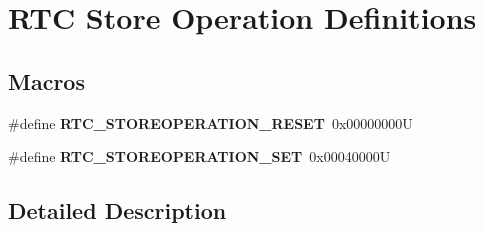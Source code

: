 \hypertarget{group___r_t_c___store_operation___definitions}{}\section{R\+TC Store Operation Definitions}
\label{group___r_t_c___store_operation___definitions}
\subsection*{Macros}
\begin{DoxyCompactItemize}
\item 
\mbox{\label{group___r_t_c___store_operation___definitions_ga0c0fb2efa26fd29872759f6162fafefa}} 
\#define {\bfseries R\+T\+C\+\_\+\+S\+T\+O\+R\+E\+O\+P\+E\+R\+A\+T\+I\+O\+N\+\_\+\+R\+E\+S\+ET}~0x00000000U
\item 
\mbox{\label{group___r_t_c___store_operation___definitions_ga984ee81edc6b876d035683d65a5c60d8}} 
\#define {\bfseries R\+T\+C\+\_\+\+S\+T\+O\+R\+E\+O\+P\+E\+R\+A\+T\+I\+O\+N\+\_\+\+S\+ET}~0x00040000U
\end{DoxyCompactItemize}


\subsection{Detailed Description}
